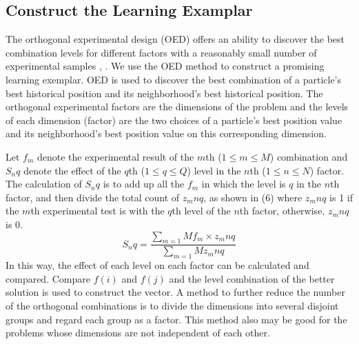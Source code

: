 \subsection{Construct the Learning Examplar}\label{subsec:construct}
\par The orthogonal experimental design (OED) offers an ability to discover the best combination levels for different factors with a reasonably small number of experimental samples \cite{dc2000design}, \cite{beijing}. We  use the OED method to construct a promising learning exemplar. OED is used to discover the best combination of a particle’s best historical position and its neighborhood’s best historical position. The orthogonal experimental factors are the dimensions of the problem and the levels of each dimension (factor) are the two choices of a particle’s best position value and its neighborhood’s best position value on this corresponding dimension.
\par Let $f_m$ denote the experimental result of the $m$th ($1\leq m \leq M$) combination and $S_nq $ denote the effect of the $q$th ($1 \leq q \leq Q$) level in the $n$th ($1 \leq n \leq N$) factor. The calculation of $S_nq$ is to add up all the $f_m$ in which the level is $q$ in the $n$th factor, and then divide the total count of $z_mnq $, as shown in (6) where $z_mnq $ is 1 if the $m$th experimental test is with the $q$th level of the $n$th factor, otherwise, $z_mnq $ is 0.
\begin{equation}
 S_nq = \frac{\sum_{m=1}\nolimits M f_m \times z_mnq}{\sum_{m=1}\nolimits M z_mnq}
\end{equation}
In this way, the effect of each level on each factor can be calculated and compared. Compare $f(i)$ and $f (j)$ and the level combination of the better solution is used to construct the vector. A method to further
reduce the number of the orthogonal combinations is to divide the dimensions into several disjoint groups and regard each group as a factor. This method also may be good for the problems whose dimensions are not independent of each other.




